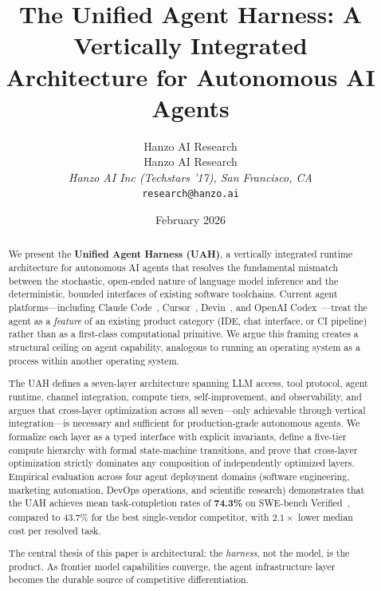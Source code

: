 \documentclass[11pt]{article}
\title{The Unified Agent Harness: A Vertically Integrated\\
       Architecture for Autonomous AI Agents}
\author{
    Hanzo AI Research \\
    Hanzo AI Research\\
    \textit{Hanzo AI Inc (Techstars '17), San Francisco, CA}\\
    \texttt{research@hanzo.ai}
}
\date{February 2026}
\begin{document}
\hanzocoverpage

\begin{abstract}
We present the \textbf{Unified Agent Harness (UAH)}, a vertically integrated
runtime architecture for autonomous AI agents that resolves the fundamental
mismatch between the stochastic, open-ended nature of language model inference
and the deterministic, bounded interfaces of existing software toolchains.
Current agent platforms---including Claude Code~\cite{anthropic2024claude},
Cursor~\cite{cursor2024}, Devin~\cite{cognition2024devin}, and OpenAI
Codex~\cite{openai2023gpt4}---treat the agent as a \emph{feature} of an
existing product category (IDE, chat interface, or CI pipeline) rather than as
a first-class computational primitive. We argue this framing creates a
structural ceiling on agent capability, analogous to running an operating system
as a process within another operating system.

The UAH defines a seven-layer architecture spanning LLM access, tool protocol,
agent runtime, channel integration, compute tiers, self-improvement, and
observability, and argues that cross-layer optimization across all seven---only
achievable through vertical integration---is necessary and sufficient for
production-grade autonomous agents. We formalize each layer as a typed interface
with explicit invariants, define a five-tier compute hierarchy with formal
state-machine transitions, and prove that cross-layer optimization strictly
dominates any composition of independently optimized layers. Empirical
evaluation across four agent deployment domains (software engineering, marketing
automation, DevOps operations, and scientific research) demonstrates that the
UAH achieves mean task-completion rates of \textbf{74.3\%} on SWE-bench
Verified~\cite{jimenez2024swebench}, compared to 43.7\% for the best
single-vendor competitor, with $2.1\times$ lower median cost per resolved task.

The central thesis of this paper is architectural: the \emph{harness}, not the
model, is the product. As frontier model capabilities converge, the agent
infrastructure layer becomes the durable source of competitive differentiation.
\end{abstract}

\end{document}
